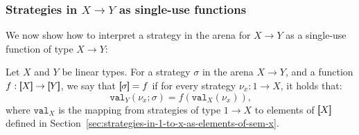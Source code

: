 


\subsubsection{Strategies in $X \to Y$ as single-use functions}
We now show how to interpret a strategy in the arena for $X \to Y$ as a single-use function of type $X \to Y$:

\begin{definition}\label{def:strategy-as-single-use-function}
    Let $X$ and $Y$ be linear types. For a strategy $\sigma$ in the arena $X \to Y$,
    and a function $f : \sem{X} \to \sem{Y}$, we say that $[\!\![\sigma]\!\!] = f$ if for every strategy 
    $\nu_x : 1 \to X$, it holds that: 
    \[ \mathtt{val}_Y(\nu_x ; \sigma) = f(\mathtt{val}_X(\nu_x)) \textrm{,} \]
    where $\mathtt{val}_X$ is the mapping from strategies of type $1 \to X$ to elements of $[\!\![X]\!\!]$ 
    defined in Section~\ref{sec:strategies-in-1-to-x-as-elements-of-sem-x}.
\end{definition}

